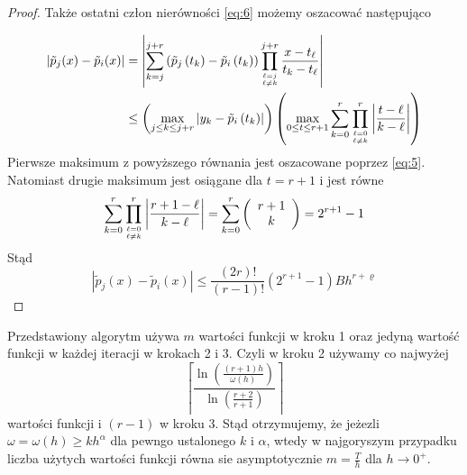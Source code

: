 \documentclass[oik, pdftex, robocza, man]{mgrwms}
\begin{document}
\begin{proof}
        Także ostatni człon nierówności \ref{eq:6} możemy oszacować następująco

        \begin{equation*}
            \begin{aligned}
                \left|\tilde{p}_{j}(x)-\tilde{p}_{i}(x)\right| &=\left|\sum_{k=j}^{j+r}\left(\tilde{p}_{j}\left(t_{k}\right)-\tilde{p}_{i}\left(t_{k}\right)\right) \prod_{\ell=j \atop \ell \neq k}^{j+r} \frac{x-t_{\ell}}{t_{k}-t_{\ell}}\right| \\
                & \leq\left(\max _{j \leq k \leq j+r}\left|y_{k}-\tilde{p}_{i}\left(t_{k}\right)\right|\right)\left(\max _{0 \leq t \leq r+1} \sum_{k=0}^{r} \prod_{\ell=0 \atop \ell \neq k}^{r}\left|\frac{t-\ell}{k-\ell}\right|\right)
            \end{aligned}                
        \end{equation*}
        Pierwsze maksimum z powyższego równania jest oszacowane poprzez \ref{eq:5}. Natomiast drugie maksimum jest osiągane dla $t=r+1$ i jest równe
        \begin{equation*}
            \sum_{k=0}^{r} \prod_{\ell=0 \atop \ell \neq k}^{r}\left|\frac{r+1-\ell}{k-\ell}\right|=\sum_{k=0}^{r}\left(\begin{array}{c} r+1 \\ k\end{array}\right)=2^{r+1}-1
        \end{equation*}
        Stąd
        \begin{equation*}
            \left|\tilde{p}_{j}(x)-\tilde{p}_{i}(x)\right| \leq \frac{(2 r) !}{(r-1) !}\left(2^{r+1}-1\right) B h^{r+\varrho}
        \end{equation*}
    \end{proof}


    Przedstawiony algorytm używa $m$ wartości funkcji w kroku 1 oraz jedyną wartość funkcji w każdej iteracji w krokach 2 i 3. Czyli w kroku 2 używamy co najwyżej
    \begin{equation*}
        \left\lceil\frac{\ln \left(\frac{(r+1) h}{\omega(h)}\right)}{\ln \left(\frac{r+2}{r+1}\right)}\right\rceil
    \end{equation*}
    wartości funkcji i $(r-1)$ w kroku 3.
    Stąd otrzymujemy, że jeżezli $\omega = \omega(h) \geq kh^{\alpha}$ dla pewngo ustalonego $k$ i $\alpha$, wtedy w najgoryszym przypadku liczba użytych wartości funkcji równa sie asymptotycznie $m = \frac{T}{h}$ dla $h \rightarrow 0^{+}$. \\
\end{document}
